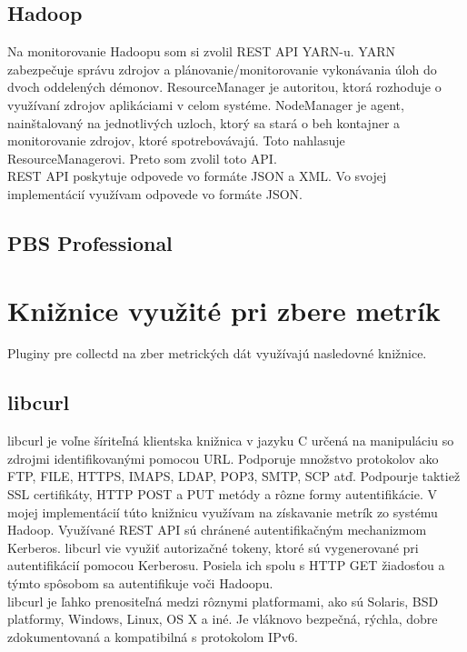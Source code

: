 \documentclass[printed,11pt,twoside,color,cover,table]{fithesis3}
\begin{document}
\subsection{Hadoop}
Na monitorovanie Hadoopu som si zvolil REST API YARN-u. YARN zabezpečuje správu zdrojov a plánovanie/monitorovanie vykonávania úloh do dvoch
oddelených démonov.\cite{hadoop-yarn} 
ResourceManager je autoritou, ktorá rozhoduje o využívaní zdrojov aplikáciami v celom systéme. NodeManager
je agent, nainštalovaný na jednotlivých uzloch, ktorý sa stará o beh kontajner a monitorovanie zdrojov, ktoré spotrebovávajú. Toto
nahlasuje ResourceManagerovi. Preto som zvolil toto API.
\\REST API poskytuje odpovede vo formáte JSON a XML. Vo svojej implementácií využívam odpovede vo formáte JSON.

\subsection{PBS Professional}

\section{Knižnice využité pri zbere metrík}
Pluginy pre collectd na zber metrických dát využívajú nasledovné knižnice. 

\subsection{libcurl}
libcurl je voľne šíriteľná klientska knižnica v jazyku C určená na manipuláciu so zdrojmi identifikovanými pomocou URL. Podporuje
množstvo protokolov ako FTP, FILE, HTTPS, IMAPS, LDAP, POP3, SMTP, SCP atď. Podpourje taktiež SSL certifikáty,
HTTP POST a PUT metódy a rôzne formy autentifikácie. V mojej implementácií túto knižnicu využívam na získavanie metrík zo systému
Hadoop. Využívané REST API sú chránené autentifikačným mechanizmom Kerberos. libcurl vie využiť autorizačné tokeny,
ktoré sú vygenerované pri autentifikácií pomocou Kerberosu. Posiela ich spolu s HTTP GET žiadosťou a týmto spôsobom
sa autentifikuje voči Hadoopu.
\\libcurl je ľahko prenositeľná medzi rôznymi platformami, ako sú Solaris, BSD platformy, Windows, Linux, OS X a iné. Je vláknovo
bezpečná, rýchla, dobre zdokumentovaná a kompatibilná s protokolom IPv6. \cite{libcurl}
\end{document}
